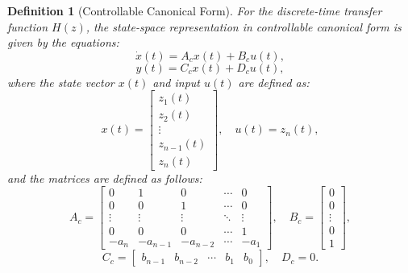 \documentclass[a4 paper]{article}
\numberwithin{equation}{section}
\theoremstyle{boldStyle}
\theoremstyle{boldBlueStyle}
\theoremstyle{boldPurpleStyle}
\theoremstyle{boldRedStyle}
\newtheorem{definition}{Definition}[section]
\theoremstyle{boldGreenStyle}
\begin{document}
\begin{definition}[Controllable Canonical Form]
For the discrete-time transfer function $H(z)$, the state-space representation in controllable canonical form is given by the equations:
\[
\dot{x}(t) = A_c x(t) + B_c u(t),
\]
\[
y(t) = C_c x(t) + D_c u(t),
\]
where the state vector \( x(t) \) and input \( u(t) \) are defined as:
\[
x(t) = \begin{bmatrix}
z_1(t) \\
z_2(t) \\
\vdots \\
z_{n-1}(t) \\
z_n(t)
\end{bmatrix},
\quad
u(t) = z_n(t),
\]
and the matrices are defined as follows:
\[
A_c = \begin{bmatrix}
0 & 1 & 0 & \cdots & 0 \\
0 & 0 & 1 & \cdots & 0 \\
\vdots & \vdots & \vdots & \ddots & \vdots \\
0 & 0 & 0 & \cdots & 1 \\
-a_n & -a_{n-1} & -a_{n-2} & \cdots & -a_1
\end{bmatrix},
\quad
B_c = \begin{bmatrix}
0 \\
0 \\
\vdots \\
0 \\
1
\end{bmatrix},
\]
\[
C_c = \begin{bmatrix}
b_{n-1} & b_{n-2} & \cdots & b_1 & b_0
\end{bmatrix},
\quad
D_c = 0.
\]
\end{definition}














\newpage
\end{document}
